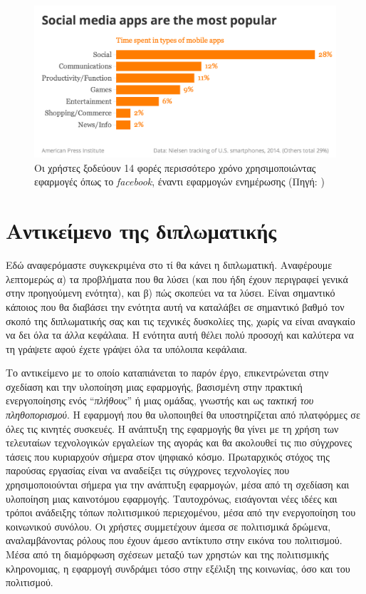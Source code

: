 \begin{figure}[!t]
	\includegraphics[scale=0.3]{figures/social-media-usage.png}
	\centering
	\caption{Οι χρήστες ξοδεύουν 14 φορές περισσότερο χρόνο χρησιμοποιώντας εφαρμογές όπως το  \textit{facebook}, έναντι εφαρμογών ενημέρωσης  (Πηγή: \cite{[AMP+14]})}
	\label{socialmediausage}
\end{figure}



\section{Αντικείμενο της διπλωματικής}

Εδώ αναφερόμαστε συγκεκριμένα στο τί θα κάνει η διπλωματική. Αναφέρουμε λεπτομερώς α) τα προβλήματα που θα λύσει (και που ήδη έχουν περιγραφεί γενικά στην προηγούμενη ενότητα), και β) πώς σκοπεύει να τα λύσει. 
Είναι σημαντικό κάποιος που θα διαβάσει την ενότητα αυτή να καταλάβει σε σημαντικό βαθμό τον σκοπό της διπλωματικής σας και τις τεχνικές δυσκολίες της, χωρίς να είναι αναγκαίο να δει όλα τα άλλα κεφάλαια. Η ενότητα αυτή θέλει πολύ προσοχή και καλύτερα να τη γράψετε αφού έχετε γράψει όλα τα υπόλοιπα κεφάλαια.

Το αντικείμενο με το οποίο καταπιάνεται το παρόν έργο, επικεντρώνεται στην σχεδίαση και την υλοποίηση μιας εφαρμογής, βασισμένη στην πρακτική ενεργοποίησης ενός ``\textit{πλήθους}'' ή μιας ομάδας, γνωστής και ως \textit{τακτική του πληθοπορισμού}. Η εφαρμογή που θα υλοποιηθεί θα υποστηρίζεται από  πλατφόρμες σε όλες τις κινητές συσκευές. Η ανάπτυξη της εφαρμογής θα γίνει με τη χρήση των τελευταίων τεχνολογικών εργαλείων της αγοράς και θα ακολουθεί τις πιο σύγχρονες τάσεις που κυριαρχούν σήμερα στον ψηφιακό κόσμο.
\newline
\indent
 Πρωταρχικός στόχος της παρούσας εργασίας είναι να αναδείξει τις σύγχρονες τεχνολογίες που χρησιμοποιούνται σήμερα για την ανάπτυξη εφαρμογών, μέσα από τη σχεδίαση και υλοποίηση μιας καινοτόμου εφαρμογής. Ταυτοχρόνως, εισάγονται νέες ιδέες και τρόποι ανάδειξης τόπων πολιτισμικού περιεχομένου, μέσα από την ενεργοποίηση του κοινωνικού συνόλου. Οι χρήστες συμμετέχουν άμεσα σε πολιτισμικά δρώμενα, αναλαμβάνοντας ρόλους που έχουν άμεσο αντίκτυπο στην εικόνα του πολιτισμού. Μέσα από τη διαμόρφωση σχέσεων μεταξύ των χρηστών και της πολιτισμικής κληρονομιας, η εφαρμογή συνδράμει τόσο στην εξέλιξη της κοινωνίας, όσο και του πολιτισμού. 

